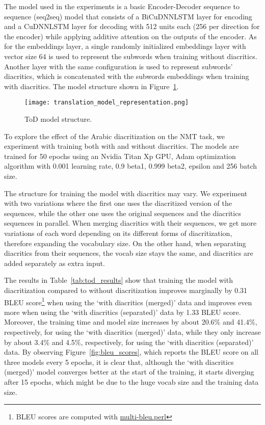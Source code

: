 \documentclass[11pt,a4paper]{article}
\newcommand{\para}[1]{\medskip \noindent {\bf #1}}
\begin{document}
\para{Model Structure}
The model used in the experiments is a basic Encoder-Decoder sequence to sequence (seq2seq) model that consists of a BiCuDNNLSTM layer for encoding and a CuDNNLSTM layer for decoding with 512 units each (256 per direction for the encoder) while applying additive attention \cite{bahdanau2014neural} on the outputs of the encoder. As for the embeddings layer, a single randomly initialized embeddings layer with vector size 64 is used to represent the subwords when training without diacritics. Another layer with the same configuration is used to represent subwords' diacritics, which is concatenated with the subwords embeddings when training with diacritics. The model structure shown in Figure~\ref{fig:tod_structure}.

\begin{figure}[h]
    \centering
    \texttt{[image: translation\_model\_representation.png]}
    \caption{ToD model structure.}
    \label{fig:tod_structure}
\end{figure}

\para{Results and Discussion}
To explore the effect of the Arabic diacritization on the NMT task, we experiment with training both with and without diacritics. The models are trained for 50 epochs using an Nvidia Titan Xp GPU, Adam optimization algorithm with 0.001 learning rate, 0.9 beta1, 0.999 beta2,  epsilon and 256 batch size.

The structure for training the model with diacritics may vary. We experiment with two variations where the first one uses the diacritized version of the sequences, while the other one uses the original sequences and the diacritics sequences in parallel. When merging diacritics with their sequences, we get more variations of each word depending on its different forms of diacritization, therefore expanding the vocabulary size. On the other hand, when separating diacritics from their sequences, the vocab size stays the same, and diacritics are added separately as extra input.

The results in Table~\ref{tab:tod_results} show that training the model with diacritization compared to without diacritization improves marginally by 0.31 BLEU score\footnote{BLEU scores are computed with \href{https://github.com/moses-smt/mosesdecoder/blob/master/scripts/generic/multi-bleu.perl}{multi-bleu.perl}}
when using the `with diacritics (merged)' data and improves even more when using the `with diacritics (separated)' data by 1.33 BLEU score. Moreover, the training time and model size increases by about 20.6\% and 41.4\%, respectively, for using the `with diacritics (merged)' data, while they only increase by about 3.4\% and 4.5\%, respectively, for using the `with diacritics (separated)' data. By observing Figure~\ref{fig:bleu_scores}, which reports the BLEU score on all three models every 5 epochs, it is clear that, although the `with diacritics (merged)' model converges better at the start of the training, it starts diverging after 15 epochs, which might be due to the huge vocab size and the training data size.
\end{document}
